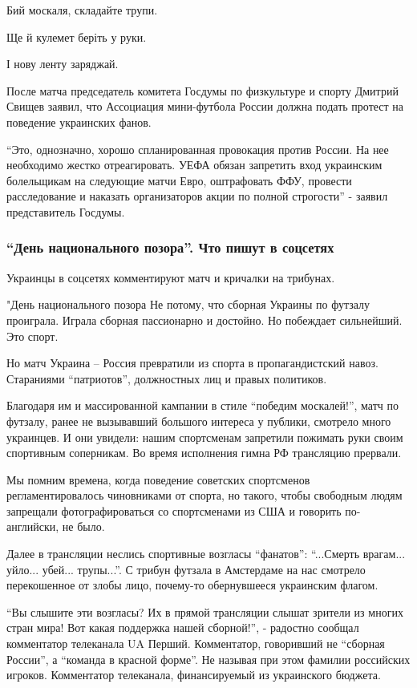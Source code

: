 Бий москаля, складайте трупи.

Ще й кулемет беріть у руки.

І нову ленту заряджай.

После матча председатель комитета Госдумы по физкультуре и спорту Дмитрий
Свищев заявил, что Ассоциация мини-футбола России должна подать протест на
поведение украинских фанов. 

\enquote{Это, однозначно, хорошо спланированная провокация против России. На нее
необходимо жестко отреагировать. УЕФА обязан запретить вход украинским
болельщикам на следующие матчи Евро, оштрафовать ФФУ, провести расследование и
наказать организаторов акции по полной строгости} - заявил представитель
Госдумы.

\subsubsection{\enquote{День национального позора}. Что пишут в соцсетях}

Украинцы в соцсетях комментируют матч и кричалки на трибунах.

"День национального позора Не потому, что сборная Украины по футзалу проиграла.
Играла сборная пассионарно и достойно. Но побеждает сильнейший. Это спорт.

Но матч Украина – Россия превратили из спорта в пропагандистский навоз.
Стараниями \enquote{патриотов}, должностных лиц и правых политиков.

Благодаря им и массированной кампании в стиле \enquote{победим москалей!}, матч
по футзалу, ранее не вызывавший большого интереса у публики, смотрело много
украинцев. И они увидели: нашим спортсменам запретили пожимать руки своим
спортивным соперникам. Во время исполнения гимна РФ трансляцию прервали.

Мы помним времена, когда поведение советских спортсменов регламентировалось
чиновниками от спорта, но такого, чтобы свободным людям запрещали
фотографироваться со спортсменами из США и говорить по-английски, не было.

Далее в трансляции неслись спортивные возгласы \enquote{фанатов}:
\enquote{...Смерть врагам...  уйло... убей... трупы...}. С трибун футзала в
Амстердаме на нас смотрело перекошенное от злобы лицо, почему-то обернувшееся
украинским флагом.

\enquote{Вы слышите эти возгласы? Их в прямой трансляции слышат зрители из
многих стран мира! Вот какая поддержка нашей сборной!}, - радостно сообщал
комментатор телеканала UA Перший. Комментатор, говоривший не \enquote{сборная
России}, а \enquote{команда в красной форме}. Не называя при этом фамилии
российских игроков. Комментатор телеканала, финансируемый из украинского
бюджета.

